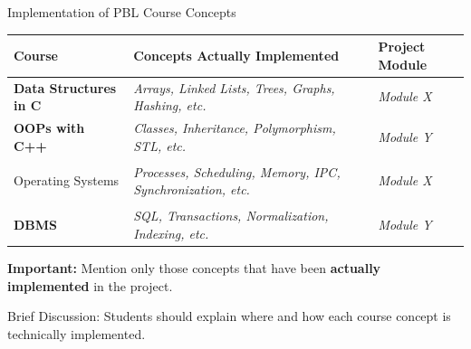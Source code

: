 \documentclass[aspectratio=169,11pt]{beamer}
\newcommand{\smallnote}[1]{%
\vspace{0.08cm}
{\scriptsize\color{GEUGrey}#1}
}
\newcommand{\placeholder}[1]{%
\textit{\color{GEUGrey}#1}
}
\begin{document}
\begin{frame}{Implementation of PBL Course Concepts}

\scriptsize

\begin{center}

\renewcommand{\arraystretch}{1.25}

\begin{tabularx}{.96\textwidth}
{@{}>{\bfseries}p{3.0cm}X p{2.5cm}@{}}

\toprule
Course & Concepts Actually Implemented & Project Module\\
\midrule

Data Structures in C &
\placeholder{Arrays, Linked Lists, Trees, Graphs, Hashing, etc.} &
\placeholder{Module X}\\

OOPs with C++ &
\placeholder{Classes, Inheritance, Polymorphism, STL, etc.} &
\placeholder{Module Y}\\

\midrule

Operating Systems &
\placeholder{Processes, Scheduling, Memory, IPC, Synchronization, etc.} &
\placeholder{Module X}\\

DBMS &
\placeholder{SQL, Transactions, Normalization, Indexing, etc.} &
\placeholder{Module Y}\\

\bottomrule

\end{tabularx}

\end{center}

\vfill

\begin{center}
\colorbox{GEULightBlue}{
\parbox{.88\textwidth}{
\centering
\textbf{Important:}
Mention only those concepts that have been
\textbf{actually implemented} in the project.
}}
\end{center}

\smallnote{
Brief Discussion: Students should explain where and how each course
concept is technically implemented.
}

\end{frame}
\end{document}
